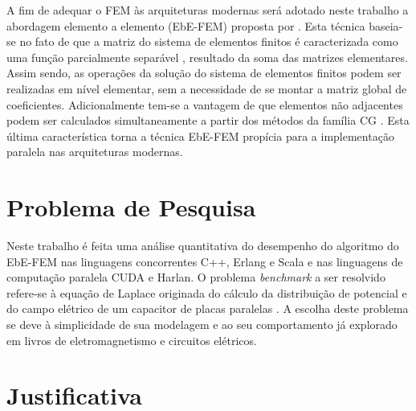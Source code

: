 \documentclass[
    12pt,               %
    openright,          %
    oneside,
    a4paper,            %
    english,            %
    french,             %
    spanish,            %
    brazil              %
    ]{abntex2}
\begin{document}
	A fim de adequar o FEM às arquiteturas modernas será adotado neste trabalho a abordagem elemento a elemento (EbE-FEM) proposta por . Esta técnica baseia-se no fato de que a matriz do sistema de elementos finitos é caracterizada como uma função parcialmente separável \cite{Dayde1995}, resultado da soma das matrizes elementares. Assim sendo, as operações da solução do sistema de elementos finitos podem ser realizadas em nível elementar, sem a necessidade de se montar a matriz global de coeficientes. Adicionalmente tem-se a vantagem de que elementos não adjacentes podem ser calculados simultaneamente a partir dos métodos da família CG \cite{Wathen1989}. Esta última característica torna a técnica EbE-FEM propícia para a implementação paralela nas arquiteturas modernas.
	
	
	

	
\section{Problema de Pesquisa}
	Neste trabalho é feita uma análise quantitativa do desempenho do algoritmo do EbE-FEM nas linguagens concorrentes C++, Erlang e Scala e nas linguagens de computação paralela CUDA e Harlan.
	O problema \textit{benchmark} a ser resolvido refere-se à equação de Laplace originada do cálculo da distribuição de potencial e do campo elétrico de um capacitor de placas paralelas \cite[Exemplo 10.3]{boylestad2011}.
	A escolha deste problema se deve à simplicidade de sua modelagem e ao seu comportamento já explorado em livros de eletromagnetismo e circuitos elétricos.
	
	
\section{Justificativa}
\end{document}
